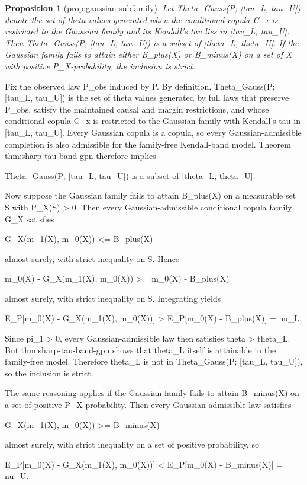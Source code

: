 \documentclass{article}
\newtheorem{proposition}{Proposition}
\begin{document}
\begin{proposition}[prop:gaussian-subfamily]\label{prop:gaussian-subfamily}
Let Theta_Gauss(P; [tau_L, tau_U]) denote the set of theta values generated when the conditional copula C_x is restricted to the Gaussian family and its Kendall's tau lies in [tau_L, tau_U]. Then Theta_Gauss(P; [tau_L, tau_U]) is a subset of [theta_L, theta_U]. If the Gaussian family fails to attain either B_plus(X) or B_minus(X) on a set of X with positive P_X-probability, the inclusion is strict.
\end{proposition}
Fix the observed law P_obs induced by P. By definition, Theta_Gauss(P; [tau_L, tau_U]) is the set of theta values generated by full laws that preserve P_obs, satisfy the maintained causal and margin restrictions, and whose conditional copula C_x is restricted to the Gaussian family with Kendall's tau in [tau_L, tau_U]. Every Gaussian copula is a copula, so every Gaussian-admissible completion is also admissible for the family-free Kendall-band model. Theorem thm:sharp-tau-band-gpn therefore implies

Theta_Gauss(P; [tau_L, tau_U]) is a subset of [theta_L, theta_U].

Now suppose the Gaussian family fails to attain B_plus(X) on a measurable set S with P_X(S) > 0. Then every Gaussian-admissible conditional copula family G_X satisfies

G_X(m_1(X), m_0(X)) <= B_plus(X)

almost surely, with strict inequality on S. Hence

m_0(X) - G_X(m_1(X), m_0(X)) >= m_0(X) - B_plus(X)

almost surely, with strict inequality on S. Integrating yields

E_P[m_0(X) - G_X(m_1(X), m_0(X))] > E_P[m_0(X) - B_plus(X)] = nu_L.

Since pi_1 > 0, every Gaussian-admissible law then satisfies theta > theta_L. But thm:sharp-tau-band-gpn shows that theta_L itself is attainable in the family-free model. Therefore theta_L is not in Theta_Gauss(P; [tau_L, tau_U]), so the inclusion is strict.

The same reasoning applies if the Gaussian family fails to attain B_minus(X) on a set of positive P_X-probability. Then every Gaussian-admissible law satisfies

G_X(m_1(X), m_0(X)) >= B_minus(X)

almost surely, with strict inequality on a set of positive probability, so

E_P[m_0(X) - G_X(m_1(X), m_0(X))] < E_P[m_0(X) - B_minus(X)] = nu_U.
\end{document}
